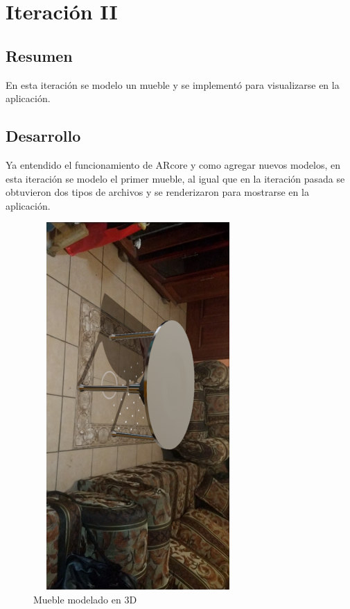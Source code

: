 \section{Iteración II}
\subsection{Resumen}
En esta iteración se modelo un mueble y se implementó para visualizarse en la aplicación.
\subsection{Desarrollo}
Ya entendido el funcionamiento de ARcore y como agregar nuevos modelos, en esta iteración se modelo el primer mueble, al igual que en la iteración pasada se obtuvieron dos tipos de archivos y se renderizaron para mostrarse en la aplicación.
\begin{figure}[H]
	\centering
	\includegraphics[width=8cm,height=14cm,angle=90]{imagenes/iteraciones/AR3.png}
	\caption{Mueble modelado en 3D}
	\label{fig:analogo}
\end{figure} 

